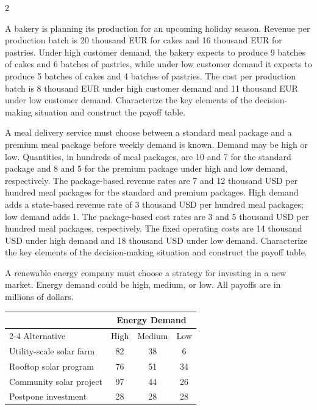 \begin{multicols}{2}
				\columnbreak
		
		A bakery is planning its production for an upcoming holiday season. Revenue per production batch is 20 thousand EUR for cakes and 16 thousand EUR for pastries. Under high customer demand, the bakery expects to produce 9 batches of cakes and 6 batches of pastries, while under low customer demand it expects to produce 5 batches of cakes and 4 batches of pastries. The cost per production batch is 8 thousand EUR under high customer demand and 11 thousand EUR under low customer demand. Characterize the key elements of the decision-making situation and construct the payoff table.
		
		A meal delivery service must choose between a standard meal package and a premium meal package before weekly demand is known. Demand may be high or low. Quantities, in hundreds of meal packages, are 10 and 7 for the standard package and 8 and 5 for the premium package under high and low demand, respectively. The package-based revenue rates are 7 and 12 thousand USD per hundred meal packages for the standard and premium packages. High demand adds a state-based revenue rate of 3 thousand USD per hundred meal packages; low demand adds 1. The package-based cost rates are 3 and 5 thousand USD per hundred meal packages, respectively. The fixed operating costs are 14 thousand USD under high demand and 18 thousand USD under low demand. Characterize the key elements of the decision-making situation and construct the payoff table.
		
		\columnbreak
		
		
		A renewable energy company must choose a strategy for investing in a new market. Energy demand could be high, medium, or low. All payoffs are in millions of dollars.
		
		\begin{center}
			\renewcommand{\arraystretch}{1.3}
			\small
			\begin{tabular}{lccc}
				\toprule
				& \multicolumn{3}{c}{Energy Demand} \\
				\cmidrule(lr){2-4}
				Alternative & High & Medium & Low \\
				\midrule
				Utility-scale solar farm & 82 & 38 & 6 \\
				Rooftop solar program & 76 & 51 & 34 \\
				Community solar project & 97 & 44 & 26 \\
				Postpone investment & 28 & 28 & 28 \\
				\bottomrule
			\end{tabular}
		\end{center}
		

\end{multicols}
